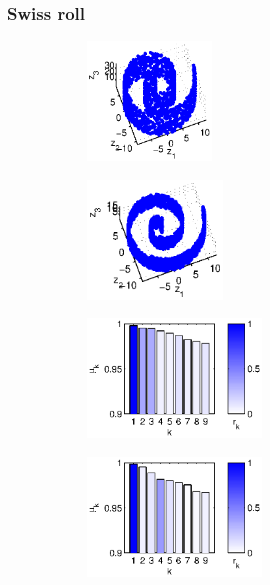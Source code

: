 \documentclass[preprint]{elsarticle}
\begin{document}
\subsubsection{Swiss roll}

\begin{figure}[!th]
%
\begin{subfigure}{0.45\textwidth}
\centering
\includegraphics[height=1.25in]{swissroll1}
\caption{}
\end{subfigure}
\hfill
\begin{subfigure}{0.45\textwidth}
\centering
\includegraphics[height=1.25in]{swissroll2}
\caption{}
\end{subfigure}
\hfill
\begin{subfigure}{0.45\textwidth}
\centering
\includegraphics[height=1.25in]{swissroll1_evals}
\caption{}
\end{subfigure}
\hfill
\begin{subfigure}{0.45\textwidth}
\centering
\includegraphics[height=1.25in]{swissroll2_evals}
\caption{}
\end{subfigure}
\hfill
\begin{subfigure}{0.45\textwidth}
\centering

\end{subfigure}
\end{figure}
\end{document}
